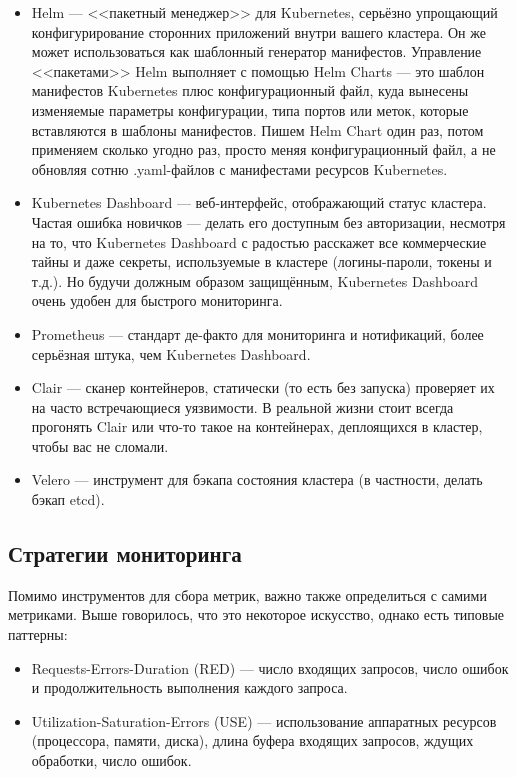 \documentclass[a5paper]{article}
\begin{document}
\begin{itemize}
    \item Helm --- <<пакетный менеджер>> для Kubernetes, серьёзно упрощающий конфигурирование сторонних приложений внутри вашего кластера. Он же может использоваться как шаблонный генератор манифестов. Управление <<пакетами>> Helm выполняет с помощью Helm Charts --- это шаблон манифестов Kubernetes плюс конфигурационный файл, куда вынесены изменяемые параметры конфигурации, типа портов или меток, которые вставляются в шаблоны манифестов. Пишем Helm Chart один раз, потом применяем сколько угодно раз, просто меняя конфигурационный файл, а не обновляя сотню .yaml-файлов с манифестами ресурсов Kubernetes.
    \item Kubernetes Dashboard --- веб-интерфейс, отображающий статус кластера. Частая ошибка новичков --- делать его доступным без авторизации, несмотря на то, что Kubernetes Dashboard с радостью расскажет все коммерческие тайны и даже секреты, используемые в кластере (логины-пароли, токены и т.д.). Но будучи должным образом защищённым, Kubernetes Dashboard очень удобен для быстрого мониторинга.
    \item Prometheus --- стандарт де-факто для мониторинга и нотификаций, более серьёзная штука, чем Kubernetes Dashboard.
    \item Clair --- сканер контейнеров, статически (то есть без запуска) проверяет их на часто встречающиеся уязвимости. В реальной жизни стоит всегда прогонять Clair или что-то такое на контейнерах, деплоящихся в кластер, чтобы вас не сломали.
    \item Velero --- инструмент для бэкапа состояния кластера (в частности, делать бэкап etcd).
\end{itemize}

\subsection{Стратегии мониторинга}

Помимо инструментов для сбора метрик, важно также определиться с самими метриками. Выше говорилось, что это некоторое искусство, однако есть типовые паттерны:

\begin{itemize}
    \item Requests-Errors-Duration (RED) --- число входящих запросов, число ошибок и продолжительность выполнения каждого запроса.
    \item Utilization-Saturation-Errors (USE) --- использование аппаратных ресурсов (процессора, памяти, диска), длина буфера входящих запросов, ждущих обработки, число ошибок.
\end{itemize}
\end{document}
